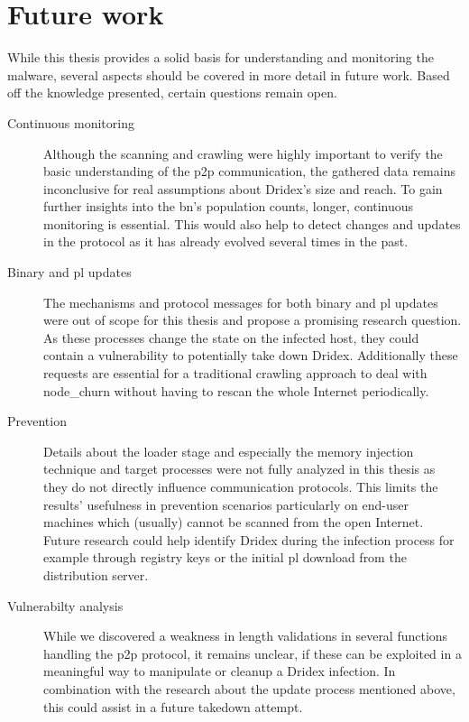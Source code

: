 \section{Future work}\label{sec:Conclusion::Future_work}
While this thesis provides a solid basis for understanding and monitoring the malware, several aspects should be covered in more detail in future work.
Based off the knowledge presented, certain questions remain open.

\begin{description}
    \item[Continuous monitoring]
    Although the scanning and crawling were highly important to verify the basic understanding of the \gls{p2p} communication, the gathered data remains inconclusive for real assumptions about Dridex's size and reach.
    To gain further insights into the \gls{bn}'s population counts, longer, continuous monitoring is essential.
    This would also help to detect changes and updates in the protocol as it has already evolved several times in the past.
    \item[Binary and \gls{pl} updates]
    The mechanisms and protocol messages for both binary and \gls{pl} updates were out of scope for this thesis and propose a promising research question.
    As these processes change the state on the infected host, they could contain a vulnerability to potentially take down Dridex.
    Additionally these requests are essential for a traditional crawling approach to deal with \gls{node_churn} without having to rescan the whole Internet periodically.
    \item[Prevention]
    Details about the loader stage and especially the memory injection technique and target processes were not fully analyzed in this thesis as they do not directly influence communication protocols.
    This limits the results' usefulness in prevention scenarios particularly on end-user machines which (usually) cannot be scanned from the open Internet.
    Future research could help identify Dridex during the infection process for example through registry keys or the initial \gls{pl} download from the distribution server.
    \item[Vulnerabilty analysis]
    While we discovered a weakness in length validations in several functions handling the \gls{p2p} protocol, it remains unclear, if these can be exploited in a meaningful way to manipulate or cleanup a Dridex infection.
    In combination with the research about the update process mentioned above, this could assist in a future takedown attempt.
\end{description}